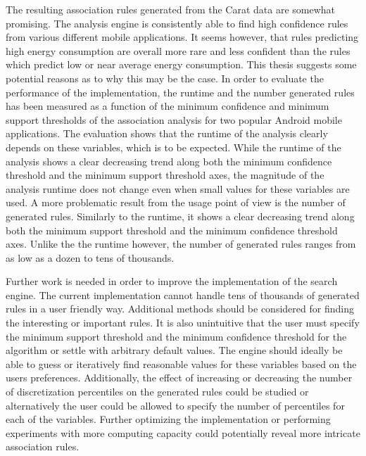 The resulting association rules generated from the Carat data are somewhat promising. The analysis engine is consistently able to find high confidence rules from various different mobile applications. It seems however, that rules predicting high energy consumption are overall more rare and less confident than the rules which predict low or near average energy consumption. This thesis suggests some potential reasons as to why this may be the case. In order to evaluate the performance of the implementation, the runtime and the number generated rules has been measured as a function of the minimum confidence and minimum support thresholds of the association analysis for two popular Android mobile applications. The evaluation shows that the runtime of the analysis clearly depends on these variables, which is to be expected. While the runtime of the analysis shows a clear decreasing trend along both the minimum confidence threshold and the minimum support threshold axes, the magnitude of the analysis runtime does not change even when small values for these variables are used. A more problematic result from the usage point of view is the number of generated rules. Similarly to the runtime, it shows a clear decreasing trend along both the minimum support threshold and the minimum confidence threshold axes. Unlike the the runtime however, the number of generated rules ranges from as low as a dozen to tens of thousands. 

Further work is needed in order to improve the implementation of the search engine. The current implementation cannot handle tens of thousands of generated rules in a user friendly way. Additional methods should be considered for finding the interesting or important rules. It is also unintuitive that the user must specify the minimum support threshold and the minimum confidence threshold for the algorithm or settle with arbitrary default values. The engine should ideally be able to guess or iteratively find reasonable values for these variables based on the users preferences. Additionally, the effect of increasing or decreasing the number of discretization percentiles on the generated rules could be studied or alternatively the user could be allowed to specify the number of percentiles for each of the variables. Further optimizing the implementation or performing experiments with more computing capacity could potentially reveal more intricate association rules.                

             